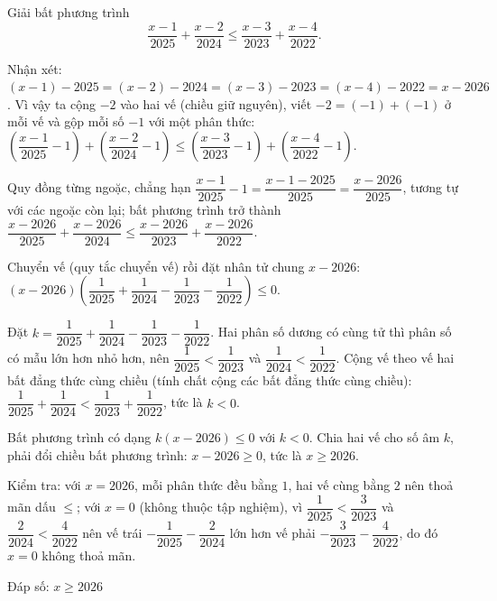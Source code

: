 \begin{problem}[9DS-BPT-031]
Giải bất phương trình
\[ \dfrac{x - 1}{2025} + \dfrac{x - 2}{2024} \leq \dfrac{x - 3}{2023} + \dfrac{x - 4}{2022}. \]

\begin{solution}
Nhận xét: $(x - 1) - 2025 = (x - 2) - 2024 = (x - 3) - 2023 = (x - 4) - 2022 = x - 2026$. Vì vậy ta cộng $-2$ vào hai vế (chiều giữ nguyên), viết $-2 = (-1) + (-1)$ ở mỗi vế và gộp mỗi số $-1$ với một phân thức: $\left(\dfrac{x - 1}{2025} - 1\right) + \left(\dfrac{x - 2}{2024} - 1\right) \leq \left(\dfrac{x - 3}{2023} - 1\right) + \left(\dfrac{x - 4}{2022} - 1\right)$.

Quy đồng từng ngoặc, chẳng hạn $\dfrac{x - 1}{2025} - 1 = \dfrac{x - 1 - 2025}{2025} = \dfrac{x - 2026}{2025}$, tương tự với các ngoặc còn lại; bất phương trình trở thành $\dfrac{x - 2026}{2025} + \dfrac{x - 2026}{2024} \leq \dfrac{x - 2026}{2023} + \dfrac{x - 2026}{2022}$.

Chuyển vế (quy tắc chuyển vế) rồi đặt nhân tử chung $x - 2026$: $(x - 2026)\left(\dfrac{1}{2025} + \dfrac{1}{2024} - \dfrac{1}{2023} - \dfrac{1}{2022}\right) \leq 0$.

Đặt $k = \dfrac{1}{2025} + \dfrac{1}{2024} - \dfrac{1}{2023} - \dfrac{1}{2022}$. Hai phân số dương có cùng tử thì phân số có mẫu lớn hơn nhỏ hơn, nên $\dfrac{1}{2025} < \dfrac{1}{2023}$ và $\dfrac{1}{2024} < \dfrac{1}{2022}$. Cộng vế theo vế hai bất đẳng thức cùng chiều (tính chất cộng các bất đẳng thức cùng chiều): $\dfrac{1}{2025} + \dfrac{1}{2024} < \dfrac{1}{2023} + \dfrac{1}{2022}$, tức là $k < 0$.

Bất phương trình có dạng $k(x - 2026) \leq 0$ với $k < 0$. Chia hai vế cho số âm $k$, phải đổi chiều bất phương trình: $x - 2026 \geq 0$, tức là $x \geq 2026$.

Kiểm tra: với $x = 2026$, mỗi phân thức đều bằng $1$, hai vế cùng bằng $2$ nên thoả mãn dấu $\leq$; với $x = 0$ (không thuộc tập nghiệm), vì $\dfrac{1}{2025} < \dfrac{3}{2023}$ và $\dfrac{2}{2024} < \dfrac{4}{2022}$ nên vế trái $-\dfrac{1}{2025} - \dfrac{2}{2024}$ lớn hơn vế phải $-\dfrac{3}{2023} - \dfrac{4}{2022}$, do đó $x = 0$ không thoả mãn.

Đáp số: $\boxed{x \geq 2026}$
\end{solution}
\end{problem}


